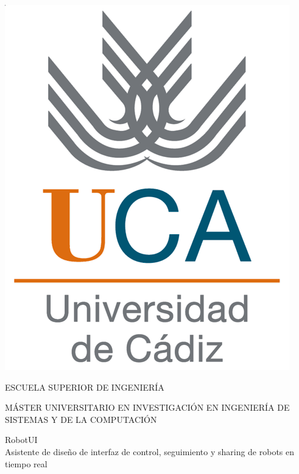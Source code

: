 

\pagestyle{empty}
\begin{center}

  \includegraphics[scale=0.2]{inicio/logo_uca.png} \\

  \vspace{2.0cm}

  \Large{ESCUELA SUPERIOR DE INGENIERÍA} \\

  \vspace{1.0cm}

  \large{MÁSTER UNIVERSITARIO EN INVESTIGACIÓN EN INGENIERÍA DE SISTEMAS Y DE LA COMPUTACIÓN} \\
  
  \vspace{2.0cm}

  \large{RobotUI \\Asistente de diseño de interfaz de control, seguimiento y sharing de robots en tiempo real} \\

  \vspace{1.0cm}

\end{center}

